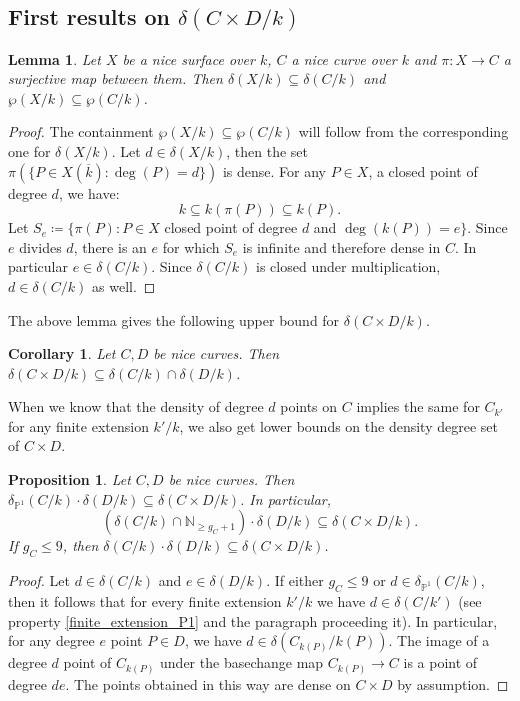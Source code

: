 \documentclass[a4paper,11pt]{amsart}
\theoremstyle{plain}
\newtheorem{coroll}[thm]{Corollary}
\newtheorem{lemma}[thm]{Lemma}
\newtheorem{prop}[thm]{Proposition}
\theoremstyle{remark}
\newcommand{\nn}{\mathbb{N}}
\newcommand{\pp}{\mathbb{P}}
\newcommand{\dendegs}{\delta}
\begin{document}
\subsection{First results on $\dendegs(C\times D/k)$}

\begin{lemma}\label{bound1} Let $X$ be a nice surface over $k$, $C$ a nice curve over $k$ and $\pi: X\to C$ a surjective map between them. Then 
    $\dendegs(X/k)\subseteq \dendegs(C/k)$ and $\wp(X/k)\subseteq \wp(C/k)$.
\end{lemma}

\begin{proof} The containment $\wp(X/k)\subseteq \wp(C/k)$ will follow from the corresponding one for $\dendegs(X/k)$. 
    Let $d\in \dendegs(X/k)$, then the set $\pi (\{ P\in X(\overline{k}): \deg(P)=d\} )$ is dense. 
    For any $P\in X$, a closed point of degree $d$, we have:
    \[
        k\subseteq k(\pi(P))\subseteq k(P).
    \]
    Let $S_e\coloneqq \{ \pi(P): P\in X$ closed point of degree $d$ and $\deg(k(P))=e \}$. 
    Since $e$ divides $d$, there is an $e$ for which $S_e$ is infinite and therefore dense in $C$. 
    In particular $e\in \dendegs(C/k)$.
    Since $\dendegs(C/k)$ is closed under multiplication, $d\in \dendegs(C/k)$ as well.
\end{proof} 

The above lemma gives the following upper bound for $\dendegs(C\times D/k)$.

 \begin{coroll}\label{cor:intersection}
     Let $C, D$ be nice curves. 
     Then $\dendegs(C\times D / k) \subseteq \dendegs(C/k)\cap \dendegs(D/k)$.
 \end{coroll}

 When we know that the density of degree \(d\) points on \(C\) implies the same for \(C_{k'}\) for any finite extension \(k'/k\), we also get lower bounds on the density degree set of \(C \times D\).


\begin{prop}\label{inclusionsprod}
    Let $C, D$ be nice curves.  Then
     \(\dendegs_{\pp^1}(C/k)\cdot \dendegs(D/k)  \subseteq \dendegs(C\times D / k)\). In particular,
    \[
       \left( \dendegs(C/k)\cap \nn_{\geq g_C + 1}\right) \cdot \dendegs(D/k)  \subseteq \dendegs(C\times D / k).
    \]
    If \(g_C \leq 9\), then \(\dendegs(C/k)\cdot \dendegs(D/k)  \subseteq \dendegs(C\times D / k)\).
\end{prop}


\begin{proof} 
    Let $d\in \dendegs(C/k)$ and $e\in \dendegs(D/k)$.  If either \(g_C \leq 9\) or \(d \in \dendegs_{\pp^1}(C/k)\), then it follows that for every finite extension \(k'/k\) we have \(d \in \dendegs(C/k')\) (see property \ref{finite_extension_P1} and the paragraph proceeding it).  In particular, for any degree \(e\) point \(P \in D\), we have \(d \in \dendegs(C_{k(P)}/k(P))\).  The image of a degree \(d\) point of \(C_{k(P)}\) under the basechange map \(C_{k(P)} \to C\) is a point of degree \(de\).  The points obtained in this way are dense on \(C\times D\) by assumption. 
\end{proof}
\end{document}
